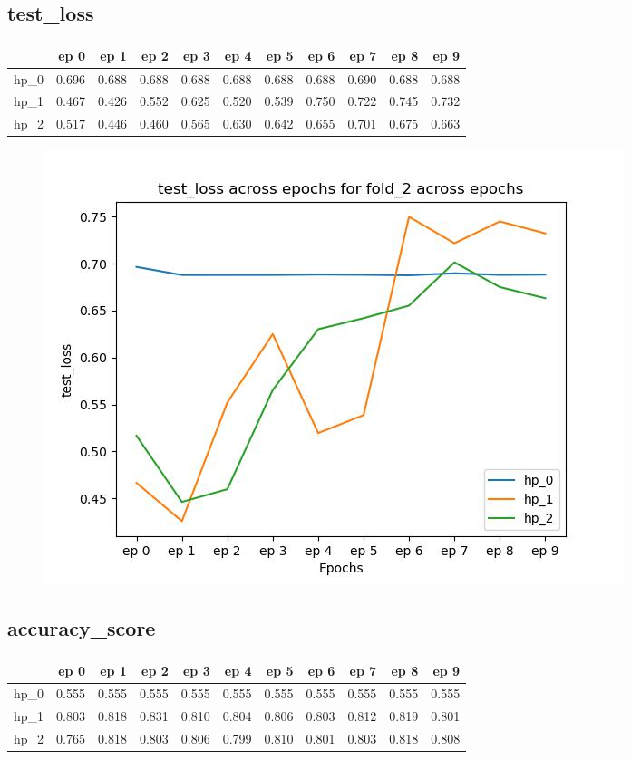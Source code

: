 \documentclass{article}
\begin{document}
\subsection{test\_loss}
\begin{tabular}{lrrrrrrrrrr}
\toprule
{} &   ep 0 &   ep 1 &   ep 2 &   ep 3 &   ep 4 &   ep 5 &   ep 6 &   ep 7 &   ep 8 &   ep 9 \\
\midrule
hp\_0 &  0.696 &  0.688 &  0.688 &  0.688 &  0.688 &  0.688 &  0.688 &  0.690 &  0.688 &  0.688 \\
hp\_1 &  0.467 &  0.426 &  0.552 &  0.625 &  0.520 &  0.539 &  0.750 &  0.722 &  0.745 &  0.732 \\
hp\_2 &  0.517 &  0.446 &  0.460 &  0.565 &  0.630 &  0.642 &  0.655 &  0.701 &  0.675 &  0.663 \\
\bottomrule
\end{tabular}

\begin{figure}[H]
\includegraphics[scale = 0.75]{fold_2/test_loss}
\end{figure}
\subsection{accuracy\_score}
\begin{tabular}{lrrrrrrrrrr}
\toprule
{} &   ep 0 &   ep 1 &   ep 2 &   ep 3 &   ep 4 &   ep 5 &   ep 6 &   ep 7 &   ep 8 &   ep 9 \\
\midrule
hp\_0 &  0.555 &  0.555 &  0.555 &  0.555 &  0.555 &  0.555 &  0.555 &  0.555 &  0.555 &  0.555 \\
hp\_1 &  0.803 &  0.818 &  0.831 &  0.810 &  0.804 &  0.806 &  0.803 &  0.812 &  0.819 &  0.801 \\
hp\_2 &  0.765 &  0.818 &  0.803 &  0.806 &  0.799 &  0.810 &  0.801 &  0.803 &  0.818 &  0.808 \\
\bottomrule
\end{tabular}
\end{document}
